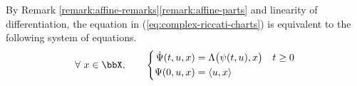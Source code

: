 \begin{remark}
  \label{remark:riccati-affine-formulation}
  By Remark \ref{remark:affine-remarks}\ref{remark:affine-parts} and linearity of differentiation, the equation in (\ref{eq:complex-riccati-charts}) is equivalent to the following system of equations.
  \begin{equation}
    \label{eq:complex-riccati-system}
    \forall ~ \stateVar \in \stateSpace, \qquad \left\{\begin{aligned}
      \dot\aff(t, \momentVar, \stateVar) &= \ode\big(\affPart(t,\momentVar), \stateVar\big) & t \geq 0 \\
      \aff(0,\momentVar, \stateVar) &= \prj{\momentVar}{\stateVar}
    \end{aligned}\right.
  \end{equation}
\end{remark}
